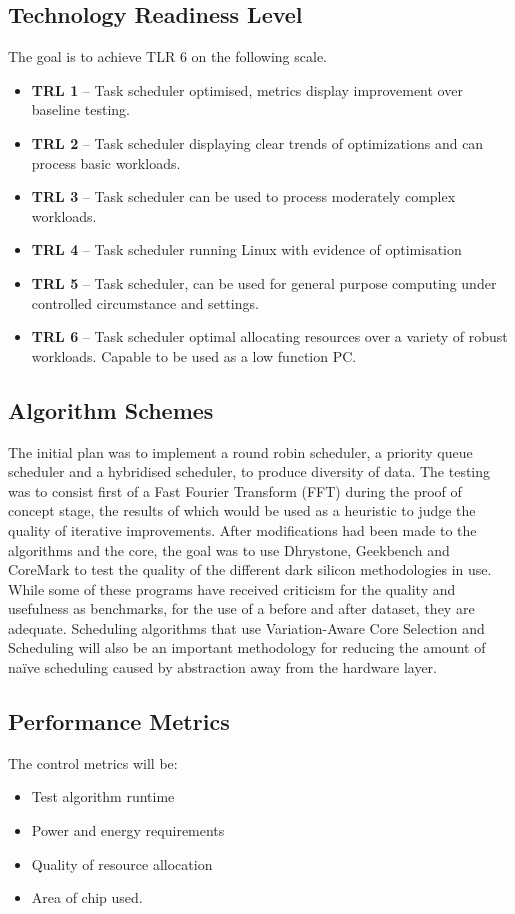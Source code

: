 	\subsection{Technology Readiness Level}
		The goal is to achieve TLR 6 on the following scale.
		\begin{itemize}
			\item \textbf{TRL 1} – Task scheduler optimised, metrics display improvement over baseline testing.
			\item \textbf{TRL 2} – Task scheduler displaying clear trends of optimizations and can process basic workloads.
			\item \textbf{TRL 3} – Task scheduler can be used to process moderately complex workloads.
			\item \textbf{TRL 4} – Task scheduler running Linux with evidence of optimisation
			\item \textbf{TRL 5} – Task scheduler, can be used for general purpose computing under controlled circumstance and settings.
			\item \textbf{TRL 6} – Task scheduler optimal allocating resources over a variety of robust workloads.  Capable to be used as a low function PC.
		\end{itemize}



	\subsection{Algorithm Schemes}	
		The initial plan was to implement a round robin scheduler, a priority queue scheduler and a hybridised scheduler, to produce diversity of data. The testing was to consist first of a Fast Fourier Transform (FFT) during the proof of concept stage, the results of which would be used as a heuristic to judge the quality of iterative improvements. After modifications had been made to the algorithms and the core, the goal was to use Dhrystone, Geekbench and CoreMark to test the quality of the different dark silicon methodologies in use.\\
		While some of these programs have received criticism for the quality and usefulness as benchmarks, for the use of a before and after dataset, they are adequate. Scheduling algorithms that use Variation-Aware Core Selection and Scheduling will also be an important methodology for reducing the amount of naïve scheduling caused by abstraction away from the hardware layer.
	
	\subsection{Performance Metrics}
		The control metrics will be:
		\begin{itemize}
			\item Test algorithm runtime
			\item Power and energy requirements
			\item Quality of resource allocation
			\item Area of chip used.
		\end{itemize}
	

